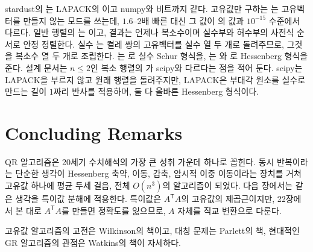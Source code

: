 \begin{instardust}
stardust의 는 LAPACK의 이고 numpy와 비트까지 같다. 고유값만 구하는 는 고유벡터를 만들지 않는 모드를 쓰는데, $1.6$--$2$배 빠른 대신 그 값이 의 값과 $10^{-15}$ 수준에서 다르다. 일반 행렬의 는 이고, 결과는 언제나 복소수이며 실수부와 허수부의 사전식 순서로 안정 정렬한다. 실수 는 켤레 쌍의 고유벡터를 실수 열 두 개로 돌려주므로, 그것을 복소수 열 두 개로 조립한다. 는 로 실수 Schur 형식을, 는 와 로 Hessenberg 형식을 준다. 설계 문서는 $n\le2$인 복소 행렬의 가 scipy와 다르다는 점을 적어 둔다. scipy는 LAPACK을 부르지 않고 원래 행렬을 돌려주지만, LAPACK은 부대각 원소를 실수로 만드는 길이 $1$짜리 반사를 적용하며, 둘 다 올바른 Hessenberg 형식이다.
\end{instardust}

\section{Concluding Remarks}

QR 알고리즘은 20세기 수치해석의 가장 큰 성취 가운데 하나로 꼽힌다. 동시 반복이라는 단순한 생각이 Hessenberg 축약, 이동, 감축, 암시적 이중 이동이라는 장치를 거쳐 고유값 하나에 평균 두세 걸음, 전체 $O(n^3)$의 알고리즘이 되었다. 다음 장에서는 같은 생각을 특이값 분해에 적용한다. 특이값은 $A^{\mathsf T}A$의 고유값의 제곱근이지만, 22장에서 본 대로 $A^{\mathsf T}A$를 만들면 정확도를 잃으므로, $A$ 자체를 직교 변환으로 다룬다.

고유값 알고리즘의 고전은 Wilkinson의 책\cite{wilkinson1965aep}이고, 대칭 문제는 Parlett의 책\cite{parlett1998}, 현대적인 GR 알고리즘의 관점은 Watkins의 책\cite{watkins2007}이 자세하다.

\chapterreferences
